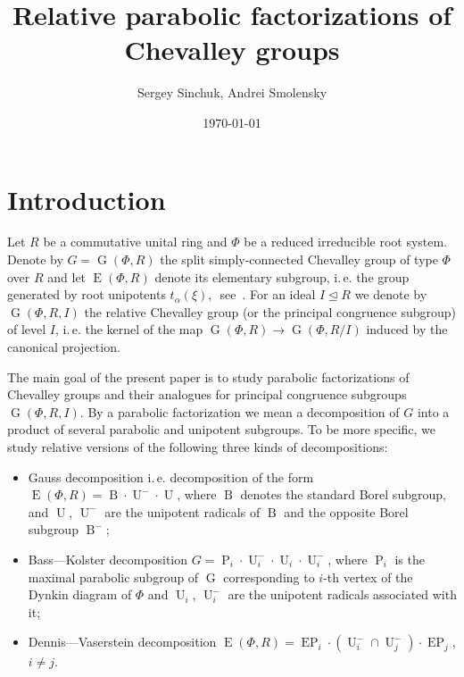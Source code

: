 \documentclass[12pt]{amsart}
\title{Relative parabolic factorizations of Chevalley groups}
\author {Sergey Sinchuk, Andrei Smolensky}
\date {\today}
\numberwithin{equation}{section}
\theoremstyle{definition}
\DeclareMathOperator{\G}{G}
\DeclareMathOperator{\E}{E}
\DeclareMathOperator{\EP}{EP}
\DeclareMathOperator{\Par}{P}
\DeclareMathOperator{\B}{B}
\DeclareMathOperator{\U}{U}
\begin{document}

\maketitle

\section{Introduction}\label{sec:intro}
Let $R$ be a commutative unital ring and $\Phi$ be a reduced irreducible root system.
Denote by $G=\G(\Phi, R)$ the split simply-connected Chevalley group of type $\Phi$ over $R$ and let $\E(\Phi, R)$ denote its elementary subgroup, 
 i.\,e. the group generated by root unipotents $t_\alpha(\xi)$, $ $ see~\cite{VP, St78, S}.
For an ideal $I \trianglelefteq R$ we denote by $\G(\Phi, R, I)$ the relative Chevalley group (or the principal congruence subgroup) of level $I$, 
i.\,e. the kernel of the map $\G(\Phi, R)\rightarrow\G(\Phi, R/I)$ induced by the canonical projection.

The main goal of the present paper is to study parabolic factorizations of Chevalley groups and their analogues for principal congruence subgroups $\G(\Phi, R, I)$.
By a parabolic factorization we mean a decomposition of $G$ into a product of several parabolic and unipotent subgroups.
To be more specific, we study relative versions of the following three kinds of decompositions:
\begin{itemize}
\item Gauss decomposition i.\,e. decomposition of the form $\E(\Phi,R)=\B \cdot \U^- \cdot \U$, where $\B$ denotes the standard Borel subgroup,
      and $\U$, $\U^-$ are the unipotent radicals of $\B$ and the opposite Borel subgroup $\B^-$;
\item Bass---Kolster decomposition $G = \Par_i \cdot \U_i^- \cdot \U_i \cdot \U_i^-$, where 
      $\Par_i$ is the maximal parabolic subgroup of $\G$ corresponding to $i$-th vertex of the Dynkin diagram of $\Phi$ and 
      $\U_i$, $\U_i^-$ are the unipotent radicals associated with it;
\item Dennis---Vaserstein decomposition $\E(\Phi, R) = \EP_i \cdot (\U_i^- \cap \U_j^-) \cdot \EP_j$, $i\neq j$.
\end{itemize}
\end{document}
